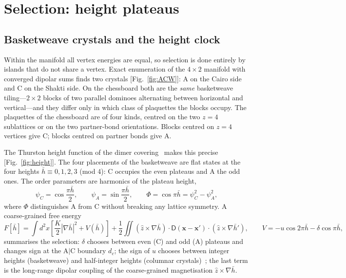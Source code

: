 \documentclass[10pt,twoside]{article}
\newcommand{\hb}{\bar h}
\begin{document}
\section{Selection: height plateaus}

\subsection{Basketweave crystals and the height clock}

Within the manifold all vertex energies are equal, so selection is done entirely by islands that do not share a vertex. Exact enumeration of the $4\times2$ manifold with converged dipolar sums finds two crystals [Fig.~\ref{fig:ACW}]: A on the Cairo side and C on the Shakti side. On the chessboard both are the \emph{same} basketweave tiling---$2\times2$ blocks of two parallel dominoes alternating between horizontal and vertical---and they differ only in which class of plaquettes the blocks occupy. The plaquettes of the chessboard are of four kinds, centred on the two $z=4$ sublattices or on the two partner-bond orientations. Blocks centred on $z=4$ vertices give C; blocks centred on partner bonds give A.

The Thurston height function of the dimer covering~\cite{Thurston1990,Henley2010} makes this precise [Fig.~\ref{fig:height}]. The four placements of the basketweave are flat states at the four heights $\hb\equiv0,1,2,3$ (mod 4): C occupies the even plateaus and A the odd ones. The order parameters are harmonics of the plateau height,
\begin{equation}
\psi_C=\cos\frac{\pi\hb}{2},\qquad\psi_A=\sin\frac{\pi\hb}{2},\qquad\Phi=\cos\pi\hb=\psi_C^2-\psi_A^2,
\end{equation}
where $\Phi$ distinguishes A from C without breaking any lattice symmetry. A coarse-grained free energy
\begin{equation}
F[\hb]=\int d^2x\left[\frac K2|\nabla\hb|^2+V(\hb)\right]+\frac12\iint(\hat z\times\nabla\hb)\cdot\mathsf D(\mathbf x-\mathbf x')\cdot(\hat z\times\nabla\hb'),
\qquad V=-u\cos2\pi\hb-\delta\cos\pi\hb,
\label{eq:F}
\end{equation}
summarises the selection: $\delta$ chooses between even (C) and odd (A) plateaus and changes sign at the A$|$C boundary $d_c$; the sign of $u$ chooses between integer heights (basketweave) and half-integer heights (columnar crystals)~\cite{Fradkin2004,Alet2005}; the last term is the long-range dipolar coupling of the coarse-grained magnetisation $\hat z\times\nabla\hb$.
\end{document}
